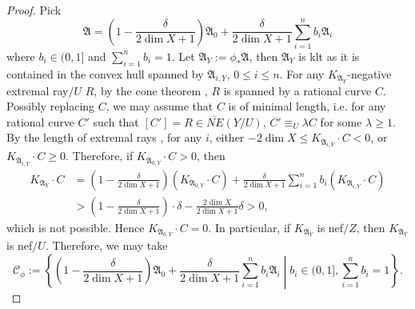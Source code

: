 \documentclass[12pt]{amsart}
\numberwithin{equation}{section}
\newcommand{\Aa}{{\mathfrak{A}}}
\theoremstyle{definition}
\theoremstyle{definition}
\theoremstyle{definition}
\begin{document}
\begin{proof}
Pick $$\Aa=\left(1-\frac{\delta}{2\dim X+1}\right)\Aa_0+\frac{\delta}{2\dim X+1}\sum_{i=1}^nb_i\Aa_i$$ where $b_i\in (0,1]$ and $\sum_{i=1}^nb_i=1$. Let $\Aa_Y:=\phi_*\Aa$, then $\Aa_Y$ is klt as it is contained in the convex hull spanned by $\Aa_{i,Y}$, $0\leq i\leq n$. For any $K_{\Aa_{Y}}$-negative extremal ray$/U$ $R$, by the cone theorem \cite[Theorem 1.3]{CHLMSSX24}, $R$ is spanned by a rational curve $C$. Possibly replacing $C$, we may assume that $C$ is of minimal length, i.e. for any rational curve $C'$ such that $[C']=R\in\overline{NE}(Y/U)$, $C'\equiv_U\lambda C$ for some $\lambda\geq 1$. By the length of extremal rays \cite[Theorem 1.3]{CHLMSSX24}, for any $i$, either $-2\dim X\leq K_{\Aa_{i,Y}}\cdot C<0$, or $K_{\Aa_{i,Y}}\cdot C\geq 0$. Therefore, if $K_{\Aa_{0,Y}}\cdot C>0$, then
\begin{align*}
    K_{\Aa_Y}\cdot C&=\left(1-\frac{\delta}{2\dim X+1}\right)(K_{\Aa_{0,Y}}\cdot C)+\frac{\delta}{2\dim X+1}\sum_{i=1}^nb_i(K_{\Aa_{i,Y}}\cdot C)\\
    &>\left(1-\frac{\delta}{2\dim X+1}\right)\cdot\delta-\frac{2\dim X}{2\dim X+1}\delta>0,
\end{align*}
which is not possible. Hence $K_{\Aa_{0,Y}}\cdot C=0$. In particular, if $K_{\Aa_Y}$ is nef$/Z$, then $K_{\Aa_Y}$ is nef$/U$. Therefore, we may take 
$$\mathcal{C}_{\phi}:=\left\{\left(1-\frac{\delta}{2\dim X+1}\right)\Aa_0+\frac{\delta}{2\dim X+1}\sum_{i=1}^nb_i\Aa_i\middle|b_i\in (0,1],\sum_{i=1}^nb_i=1\right\}.$$
\end{proof}
\end{document}
